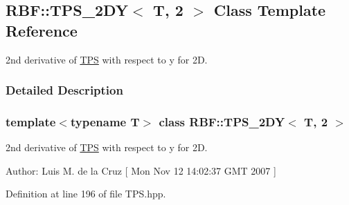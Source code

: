 \hypertarget{classRBF_1_1TPS__2DY_3_01T_00_012_01_4}{
\subsection{RBF::TPS\_\-2DY$<$ T, 2 $>$ Class Template Reference}
\label{classRBF_1_1TPS__2DY_3_01T_00_012_01_4}
}
2nd derivative of \hyperlink{classRBF_1_1TPS}{TPS} with respect to y for 2D.  




\subsubsection{Detailed Description}
\subsubsection*{template$<$typename T$>$ class RBF::TPS\_\-2DY$<$ T, 2 $>$}

2nd derivative of \hyperlink{classRBF_1_1TPS}{TPS} with respect to y for 2D. 

\begin{Desc}
\item[Author:]Luis M. de la Cruz \mbox{[} Mon Nov 12 14:02:37 GMT 2007 \mbox{]} \end{Desc}


Definition at line 196 of file TPS.hpp.